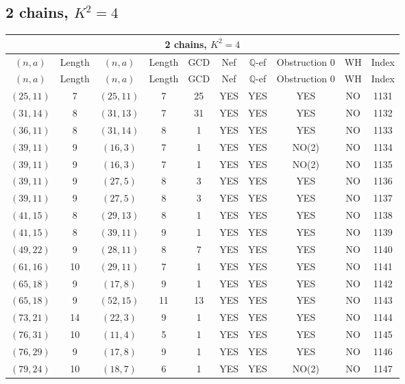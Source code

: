 \subsection{2 chains, $K^2 = 4$}
\begin{longtable}{|c|c|c|c|c|c|c|c|c|c|}
\hline
\multicolumn{10}{|c|}{2 chains, $K^2 = 4$}\\
\hline
$(n,a)$ & Length & $(n,a)$ & Length & GCD & Nef & $\mathbb Q$-ef & Obstruction 0 & WH & Index\\
\hline
\endfirsthead

\hline
$(n,a)$ & Length & $(n,a)$ & Length & GCD & Nef & $\mathbb Q$-ef & Obstruction 0 & WH & Index\\
\hline
\endhead
\hline
\endfoot

$(25, 11)$ & 7 & $(25, 11)$ & 7 & 25 & YES & YES & YES & NO & 1131\\
$(31, 14)$ & 8 & $(31, 13)$ & 7 & 31 & YES & YES & YES & NO & 1132\\
$(36, 11)$ & 8 & $(31, 14)$ & 8 & 1 & YES & YES & YES & NO & 1133\\
$(39, 11)$ & 9 & $(16, 3)$ & 7 & 1 & YES & YES & NO(2) & NO & 1134\\
$(39, 11)$ & 9 & $(16, 3)$ & 7 & 1 & YES & YES & NO(2) & NO & 1135\\
$(39, 11)$ & 9 & $(27, 5)$ & 8 & 3 & YES & YES & YES & NO & 1136\\
$(39, 11)$ & 9 & $(27, 5)$ & 8 & 3 & YES & YES & YES & NO & 1137\\
$(41, 15)$ & 8 & $(29, 13)$ & 8 & 1 & YES & YES & YES & NO & 1138\\
$(41, 15)$ & 8 & $(39, 11)$ & 9 & 1 & YES & YES & YES & NO & 1139\\
$(49, 22)$ & 9 & $(28, 11)$ & 8 & 7 & YES & YES & YES & NO & 1140\\
$(61, 16)$ & 10 & $(29, 11)$ & 7 & 1 & YES & YES & YES & NO & 1141\\
$(65, 18)$ & 9 & $(17, 8)$ & 9 & 1 & YES & YES & YES & NO & 1142\\
$(65, 18)$ & 9 & $(52, 15)$ & 11 & 13 & YES & YES & YES & NO & 1143\\
$(73, 21)$ & 14 & $(22, 3)$ & 9 & 1 & YES & YES & YES & NO & 1144\\
$(76, 31)$ & 10 & $(11, 4)$ & 5 & 1 & YES & YES & YES & NO & 1145\\
$(76, 29)$ & 9 & $(17, 8)$ & 9 & 1 & YES & YES & YES & NO & 1146\\
$(79, 24)$ & 10 & $(18, 7)$ & 6 & 1 & YES & YES & NO(2) & NO & 1147\\

\end{longtable}
